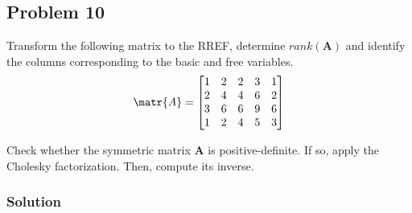 \subsection{Problem 10}
Transform  the  following  matrix  to  the  RREF,  determine $rank(\mathbf{A})$ and  identify  the columns corresponding to the basic and free variables. 
\begin{equation*}
    \matr{A} = 
    \begin{bmatrix}
    1 & 2 & 2 & 3 & 1 \\
    2 & 4 & 4 & 6 & 2 \\
    3 & 6 & 6 & 9 & 6 \\
    1 & 2 & 4 & 5 & 3 
    \end{bmatrix}
\end{equation*}

Check whether the symmetric matrix $\mathbf{A}$ is positive-definite. If so, apply the Cholesky factorization. Then, compute its inverse.

\subsubsection*{Solution}

